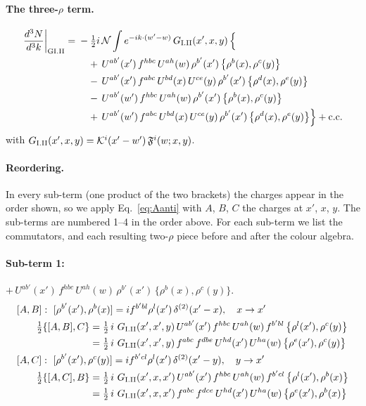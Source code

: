 \documentclass[10pt]{article}
\numberwithin{equation}{section}
\newcommand{\KK}{\mathcal K}
\newcommand{\NN}{\mathcal N}
\begin{document}
\paragraph{The three-$\rho$ term.}
\begin{align}
\frac{d^3N}{d^3k}\bigg|_{\rm GI.II}={}&-\tfrac12i\,\NN\int e^{-ik\cdot(w'-w)}\,G_{\rm I.II}(x',x,y)\,\Big\{\notag\\
&\quad +\,U^{ab'}(x')\,f^{hbc}\,U^{ah}(w)\,\rho^{b'}(x')\,\big\{\rho^{b}(x),\rho^{c}(y)\big\}\notag\\
&\quad -\,U^{ab'}(x')\,f^{abc}\,U^{bd}(x)\,U^{ce}(y)\,\rho^{b'}(x')\,\big\{\rho^{d}(x),\rho^{e}(y)\big\}\notag\\
&\quad -\,U^{ab'}(w')\,f^{hbc}\,U^{ah}(w)\,\rho^{b'}(x')\,\big\{\rho^{b}(x),\rho^{c}(y)\big\}\notag\\
&\quad +\,U^{ab'}(w')\,f^{abc}\,U^{bd}(x)\,U^{ce}(y)\,\rho^{b'}(x')\,\big\{\rho^{d}(x),\rho^{e}(y)\big\}\Big\}+{\rm c.c.}\label{eq:in-GI.II}
\end{align}
with $G_{\rm I.II}(x',x,y)=\KK^{i}(x'-w')\,\mathfrak F^{i}(w;x,y)$.
\paragraph{Reordering.} In every sub-term (one product of the two brackets) the charges appear in the order shown, so we apply Eq.~\eqref{eq:Aanti} with $A$, $B$, $C$ the charges at $x'$, $x$, $y$. The sub-terms are numbered 1--4 in the order above. For each sub-term we list the commutators, and each resulting two-$\rho$ piece before and after the colour algebra.
\paragraph{Sub-term 1:} $+\,U^{ab'}(x')\,f^{hbc}\,U^{ah}(w)\,\rho^{b'}(x')\,\big\{\rho^{b}(x),\rho^{c}(y)\big\}$.
\begin{align}
&[A,B]:\ [\rho^{b'}(x'),\rho^{b}(x)]=i f^{b'bl}\rho^{l}(x')\,\delta^{(2)}(x'-x),\quad x\to x'\notag\\
&\qquad \tfrac12\{[A,B],C\}=\tfrac12\,i\,\,G_{\rm I.II}(x',x',y)\,U^{ab'}(x')\,f^{hbc}\,U^{ah}(w)\,f^{b'bl}\,\big\{\rho^{l}(x'),\rho^{c}(y)\big\}\notag\\
&\qquad\phantom{\tfrac12\{[A,B],C\}}=\tfrac12\,i\,\,G_{\rm I.II}(x',x',y)\,f^{abc}\,f^{dbe}\,U^{hd}(x')\,U^{ha}(w)\,\big\{\rho^{e}(x'),\rho^{c}(y)\big\}
\label{eq:GI.II-1-AB}\\
&[A,C]:\ [\rho^{b'}(x'),\rho^{c}(y)]=i f^{b'cl}\rho^{l}(x')\,\delta^{(2)}(x'-y),\quad y\to x'\notag\\
&\qquad \tfrac12\{[A,C],B\}=\tfrac12\,i\,\,G_{\rm I.II}(x',x,x')\,U^{ab'}(x')\,f^{hbc}\,U^{ah}(w)\,f^{b'cl}\,\big\{\rho^{l}(x'),\rho^{b}(x)\big\}\notag\\
&\qquad\phantom{\tfrac12\{[A,C],B\}}=\tfrac12\,i\,\,G_{\rm I.II}(x',x,x')\,f^{abc}\,f^{dce}\,U^{hd}(x')\,U^{ha}(w)\,\big\{\rho^{e}(x'),\rho^{b}(x)\big\}
\label{eq:GI.II-1-AC}
\end{align}
\end{document}

